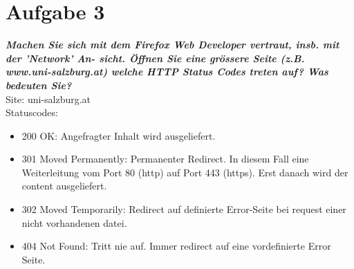 \documentclass[12pt, a4paper]{report}
\begin{document}
\section*{Aufgabe 3}
\textbf{\textit{Machen Sie sich mit dem Firefox Web Developer vertraut, insb. mit der ’Network’ An-
sicht. Öffnen Sie eine grössere Seite (z.B. www.uni-salzburg.at) welche HTTP Status
Codes treten auf? Was bedeuten Sie?}}\\
Site: uni-salzburg.at\\
Statuscodes:
\begin{itemize}
	\item 200 OK: Angefragter Inhalt wird ausgeliefert.
	\item 301 Moved Permanently: Permanenter Redirect. In diesem Fall eine Weiterleitung vom Port 80 (http) auf Port 443
	(https). Erst danach wird der content ausgeliefert.
	\item 302 Moved Temporarily: Redirect auf definierte Error-Seite bei request einer nicht vorhandenen datei.
	\item 404 Not Found: Tritt nie auf. Immer redirect auf eine vordefinierte Error Seite.
\end{itemize}
\end{document}

